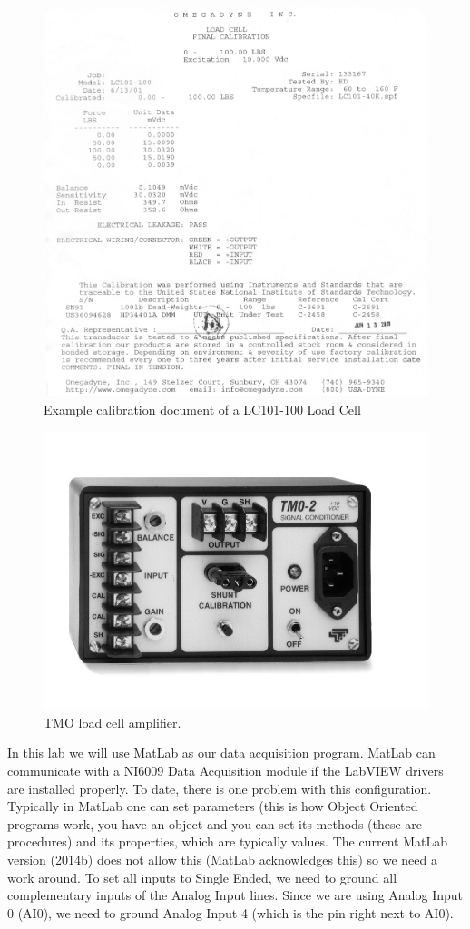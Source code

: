 \documentclass[12pt,letterpaper]{article}
\begin{document}
\begin{figure}
\centering
\includegraphics[width=1\linewidth]{Lab9_ForceMeasurementUsingLoadCell_CalibrationSheet}
\caption{Example calibration document of a LC101-100 Load Cell}
\label{fig:Lab9_ForceMeasurementUsingLoadCell_CalibrationSheet}
\end{figure}

\begin{figure}
\centering
\includegraphics[width=0.6\linewidth]{Lab9_LoadCellAmplifier}
\caption{TMO load cell amplifier.}
\label{fig:Lab9_LoadCellAmplifier}
\end{figure}

In this lab we will use MatLab as our data acquisition program. MatLab can communicate with a NI6009 Data Acquisition module if the LabVIEW drivers are installed properly. To date, there is one problem with this configuration. Typically in MatLab one can set parameters (this is how Object Oriented programs work, you have an object and you can set its methods (these are procedures) and its properties, which are typically values. The current MatLab version (2014b) does not allow this (MatLab acknowledges this) so we need a work around. To set all inputs to Single Ended, we need to ground all complementary inputs of the Analog Input lines. Since we are using Analog Input 0 (AI0), we need to ground Analog Input 4 (which is the pin right next to AI0). 
\end{document}
